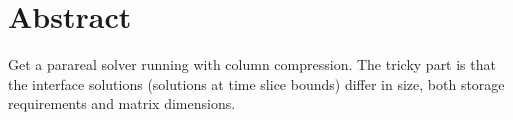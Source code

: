 \chapter{Abstract}

Get a parareal solver running with column compression.
The tricky part is that the interface solutions (solutions at time slice bounds) differ in size,
\wrt both storage requirements and matrix dimensions.
